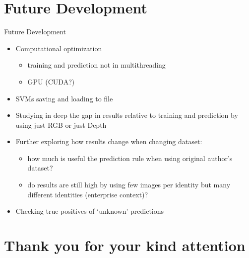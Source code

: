 \documentclass[unknownkeysallowed]{beamer}
\begin{document}
\section{Future Development}
\begin{frame}{Future Development}
	\begin{itemize}
		\item Computational optimization
			\begin{itemize}
				\item training and prediction not in
					multithreading
				\item GPU (CUDA?)
			\end{itemize}
		\item SVMs saving and loading to file
		\item Studying in deep the gap in results relative to training
			and prediction by using just RGB or just Depth
		\item Further exploring how results change when changing
			dataset:
			\begin{itemize}
				\item how much is useful the prediction rule
					when
					using original author's dataset?
				\item do results are still high by using few
					images per identity but many different
					identities (enterprise context)?
			\end{itemize}
		\item Checking true positives of `unknown'
			predictions

	\end{itemize}
\end{frame}

\section*{Thank you for your kind attention}
\end{document}

